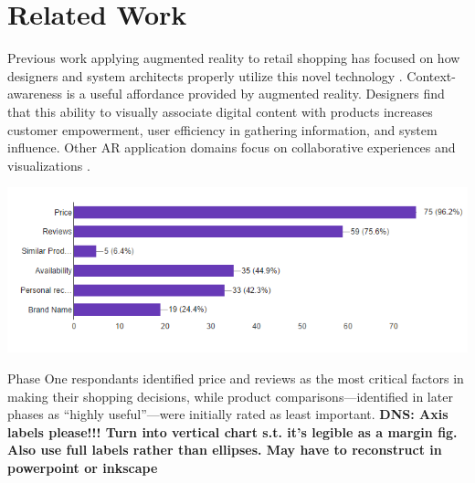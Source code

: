 \section{Related Work}

Previous work applying augmented reality to retail shopping has focused on how designers and system architects properly utilize this novel technology \cite{ahn2015supporting,kourouthanassis2007enhancing,olsson2013expected,spreer2012improving,stoyanova2015comparison,zhu2004personalized}.   Context-awareness is a useful affordance provided by augmented reality.  Designers find that this ability to visually associate digital content with products increases customer empowerment, user efficiency in gathering information, and system influence.  Other AR application domains focus on collaborative experiences and visualizations \cite{esser2016head,santos2016augmented,truong2013today}. 

\begin{marginfigure}
	\begin{minipage}{\marginparwidth}
		\includegraphics[width=0.9\columnwidth]{figures/ShoppingFactors}
		\caption{Phase One respondants identified price and reviews as the most critical factors in making their shopping decisions, while product comparisons---identified in later phases as ``highly useful''---were initially rated as least important. \textbf{DNS: Axis labels please!!! Turn into vertical chart s.t. it's legible as a margin fig. Also use full labels rather than ellipses. May have to reconstruct in powerpoint or inkscape}}
		\label{figures:ShoppingFactors}
	\end{minipage}
\end{marginfigure}

